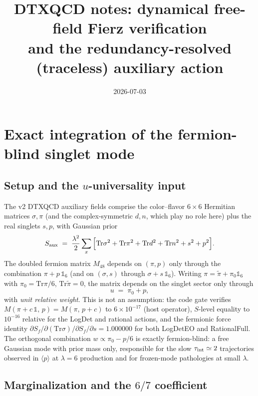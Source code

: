 \documentclass[11pt]{article}
\title{DTXQCD notes: dynamical free-field Fierz verification\\
and the redundancy-resolved (traceless) auxiliary action}
\author{}
\date{2026-07-03}
\newcommand{\Tr}{\mathrm{Tr}}
\begin{document}
\maketitle

\section{Exact integration of the fermion-blind singlet mode}
\label{sec:traceless}

\subsection{Setup and the $u$-universality input}

The v2 DTXQCD auxiliary fields comprise the color--flavor $6\times 6$
Hermitian matrices $\sigma,\pi$ (and the complex-symmetric $d,n$, which play
no role here) plus the real singlets $s,p$, with Gaussian prior
\begin{equation}
S_{\rm aux} \;=\; \frac{\lambda^{2}}{2}\sum_x\Big[\Tr\sigma^{2}+\Tr\pi^{2}
 +\Tr d^{2}+\Tr n^{2}+s^{2}+p^{2}\Big].
\label{eq:legacyprior}
\end{equation}
The doubled fermion matrix $M_{48}$ depends on $(\pi,p)$ only through the
combination $\pi + p\,\mathbb{1}_{6}$ (and on $(\sigma,s)$ through
$\sigma + s\,\mathbb{1}_{6}$).  Writing
$\pi=\tilde\pi+\pi_{0}\mathbb{1}_{6}$ with $\pi_{0}=\Tr\pi/6$,
$\Tr\tilde\pi=0$, the matrix depends on the singlet sector only through
\begin{equation}
u \;=\; \pi_{0}+p ,
\end{equation}
with \emph{unit relative weight}.  This is not an assumption: the code gate
verifies $M(\pi+c\,\mathbb{1},\,p)=M(\pi,\,p+c)$ to $6\times10^{-17}$
(host operator), $S$-level equality to $10^{-16}$ relative for the LogDet
and rational actions, and the fermionic force identity
$\partial S_{f}/\partial(\Tr\sigma) \big/ \partial S_{f}/\partial s
 = 1.000000$ for both LogDetEO and RationalFull.  The orthogonal combination
$w\propto \pi_{0}-p/6$ is exactly fermion-blind: a free Gaussian mode with
prior mass only, responsible for the slow $\tau_{\rm int}\simeq 2$
trajectories observed in $\langle p\rangle$ at $\lambda=6$ production and
for frozen-mode pathologies at small $\lambda$.

\subsection{Marginalization and the $6/7$ coefficient}
\end{document}
